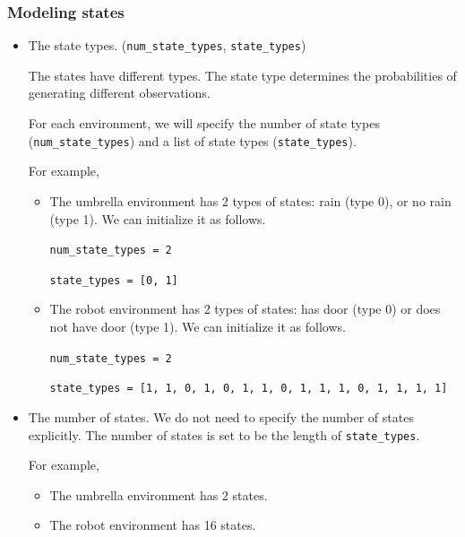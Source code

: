 \documentclass[12pt]{article}
\begin{document}
\subsubsection{Modeling states}

\begin{itemize}
    \item The state types. (\verb+num_state_types+, \verb+state_types+)
        
        The states have different types. The state type determines the probabilities of generating different observations.
        
        For each environment, we will specify the number of state types (\verb+num_state_types+) and a list of state types (\verb+state_types+).
        
        For example,
        \begin{itemize}
            \item The umbrella environment has 2 types of states: rain (type 0), or no rain (type 1). We can initialize it as follows.
            
            \verb+num_state_types = 2+
            
            \verb+state_types = [0, 1]+
            
            \item The robot environment has 2 types of states: has door (type 0) or does not have door (type 1). We can initialize it as follows.
            
            \verb+num_state_types = 2+
            
            \verb+state_types = [1, 1, 0, 1, 0, 1, 1, 0, 1, 1, 1, 0, 1, 1, 1, 1]+
            
        \end{itemize}

    \item The number of states. We do not need to specify the number of states explicitly. The number of states is set to be the length of \verb+state_types+.

    For example, 
        \begin{itemize}
            \item The umbrella environment has 2 states.
            \item The robot environment has 16 states.
        \end{itemize}         


\end{itemize}
\end{document}
